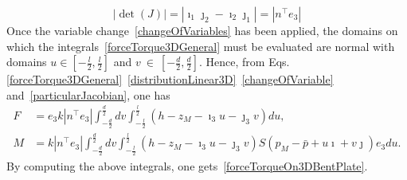 \documentclass{article}
\begin{document}
\begin{equation}
\label{particularJacobian}
|\det(J)| = |\imath_1 \jmath_2 - \imath_2 \jmath_1| = |n^\top e_3|
\end{equation}
Once the variable change~\eqref{changeOfVariables} has been applied, the domains on which the integrals~\eqref{forceTorque3DGeneral} must be evaluated are normal with domains $u\in \left[-\frac{l}{2},\frac{l}{2}\right]$ and
$v~\in~\left[-\frac{d}{2},\frac{d}{2}\right]$. Hence, from Eqs.~ \eqref{forceTorque3DGeneral}~\eqref{distributionLinear3D}~\eqref{changeOfVariable} and~\eqref{particularJacobian}, one has
\begin{subequations}
\label{forceTorque3DGeneralVC}
    \begin{alignat}{2}
\label{eq:forcesDist3DEVC}
F &= e_3 k |n^\top e_3| \int_{-\frac{d}{2}}^{\frac{d}{2}} dv \int_{-\frac{l}{2}}^{\frac{l}{2}} (h-z_M -\imath_3 u - \jmath_3 v)  du, \\
\label{eq:torqueDist3DEVC}
M &= k |n^\top e_3|
\int_{-\frac{d}{2}}^{\frac{d}{2}} dv \int_{-\frac{l}{2}}^{\frac{l}{2}}
(h{-}z_M {-}\imath_3 u {-} \jmath_3 v) S(p_M - \bar{p} + u \imath + v \jmath)e_3
  du.
    \end{alignat}
\end{subequations}
By computing the above integrals, one gets~\eqref{forceTorqueOn3DBentPlate}.
% 
% 
\end{document}
